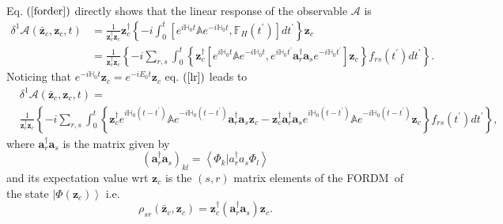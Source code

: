 \documentclass[aps,preprint]{revtex4}%
\begin{document}
Eq. $\left(  \ref{forder}\right)  $ directly shows that the linear response of
the observable $\mathcal{A}$ is
\begin{align}
\delta^{1}\mathcal{A}\left(  \mathbf{\bar{z}}_{c},\mathbf{z}_{c},t\right)   &
=\frac{1}{\mathbf{z}_{c}^{\dagger}\mathbf{z}_{c}}\mathbf{z}_{c}^{\dagger
}\left\{  -i\int_{0}^{t}\left[  e^{i\mathbb{H}_{0}t}\mathbb{A}e^{-i\mathbb{H}%
_{0}t},\mathbb{F}_{H}\left(  t^{\prime}\right)  \right]  dt^{\prime}\right\}
\mathbf{z}_{c}\nonumber\\
&  =\frac{1}{\mathbf{z}_{c}^{\dagger}\mathbf{z}_{c}}\left\{  -i\sum_{r,s}%
\int_{0}^{t}\left\{  \mathbf{z}_{c}^{\dagger}\left[  e^{i\mathbb{H}_{0}%
t}\mathbb{A}e^{-i\mathbb{H}_{0}t},e^{i\mathbb{H}_{0}t^{\prime}}\mathbf{a}%
_{r}^{\dagger}\mathbf{a}_{s}e^{-i\mathbb{H}_{0}t^{\prime}}\right]
\mathbf{z}_{c}\right\}  f_{rs}\left(  t^{\prime}\right)  dt^{\prime}\right\}
.
\end{align}
Noticing that $e^{-i\mathbb{H}_{0}t}\mathbf{z}_{c}=e^{-iE_{0}t}\mathbf{z}_{c}$
eq. $\left(  \ref{lr}\right)  $ leads to
\begin{align}
&  \delta^{1}\mathcal{A}\left(  \mathbf{\bar{z}}_{c},\mathbf{z}_{c},t\right)
=\nonumber\\
&  \frac{1}{\mathbf{z}_{c}^{\dagger}\mathbf{z}_{c}}\left\{  -i\sum_{r,s}%
\int_{0}^{t}\left\{  \mathbf{z}_{c}^{\dagger}e^{i\mathbb{H}_{0}\left(
t-t^{\prime}\right)  }\mathbb{A}e^{-i\mathbb{H}_{0}\left(  t-t^{\prime
}\right)  }\mathbf{a}_{r}^{\dagger}\mathbf{a}_{s}\mathbf{z}_{c}-\mathbf{z}%
_{c}^{\dagger}\mathbf{a}_{r}^{\dagger}\mathbf{a}_{s}e^{i\mathbb{H}_{0}\left(
t-t^{\prime}\right)  }\mathbb{A}e^{-i\mathbb{H}_{0}\left(  t-t^{\prime
}\right)  }\mathbf{z}_{c}\right\}  f_{rs}\left(  t^{\prime}\right)
dt^{\prime}\right\}  ,
\end{align}
where $\mathbf{a}_{r}^{\dagger}\mathbf{a}_{s}$ is the matrix given by
\begin{equation}
\left(  \mathbf{a}_{r}^{\dagger}\mathbf{a}_{s}\right)  _{kl}=\left\langle
\Phi_{k}\mathbf{|}a_{r}^{\dagger}a_{s}\Phi_{l}\right\rangle
\end{equation}
and its expectation value wrt $\mathbf{z}_{c}$ is the $\left(  s,r\right)  $
matrix elements of the FORDM\ of the state $\left\vert \Phi\left(
\mathbf{z}_{c}\right)  \right\rangle $ i.e.
\begin{equation}
\rho_{sr}\left(  \mathbf{\bar{z}}_{c},\mathbf{z}_{c}\right)  =\mathbf{z}%
_{c}^{\dagger}\left(  \mathbf{a}_{r}^{\dagger}\mathbf{a}_{s}\right)
\mathbf{z}_{c}.
\end{equation}
\end{document}

